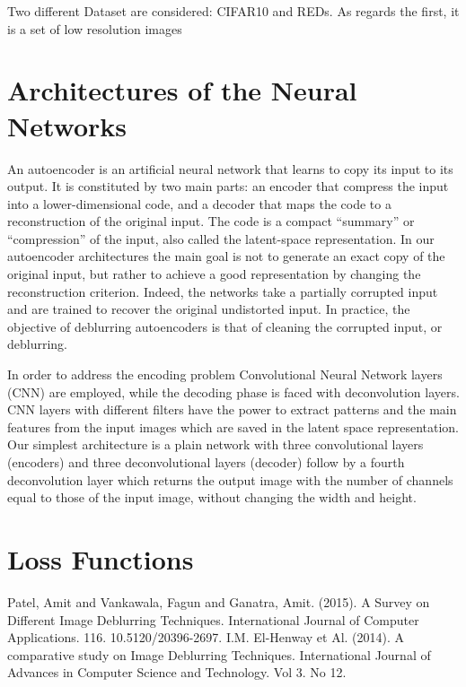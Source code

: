 \documentclass[12pt,a4paper]{article}
\begin{document}
Two different Dataset are considered: CIFAR10 and REDs. As regards the first, it is a set of low resolution images  

\section{Architectures of the Neural Networks}
An autoencoder is an artificial neural network that learns to copy its input to its output. It is constituted by two main parts: an encoder that compress the input into a lower-dimensional code, and a decoder that maps the code to a reconstruction of the original input. The code is a compact “summary” or “compression” of the input, also called the latent-space representation. In our autoencoder architectures the main goal is not to generate an exact copy of the original input, but rather to achieve a good representation by changing the reconstruction criterion. Indeed, the networks take a partially corrupted input and are trained to recover the original undistorted input. In practice, the objective of deblurring autoencoders is that of cleaning the corrupted input, or deblurring. 

In order to address the encoding problem Convolutional Neural Network layers (CNN) are employed, while the decoding phase is faced with deconvolution layers. CNN layers with different filters have the power to extract patterns and the main features from the input images which are saved in the latent space representation. Our simplest architecture is a plain network with three convolutional layers (encoders) and three deconvolutional layers (decoder) follow by a fourth deconvolution layer which returns the output image with the number of channels equal to those of the input image, without changing the width and height.

\section{Loss Functions}


\newpage
\begin{thebibliography}{99}
  Patel, Amit and Vankawala, Fagun and Ganatra, Amit. (2015). A Survey on Different Image Deblurring Techniques. International Journal of Computer Applications. 116. 10.5120/20396-2697. 
 I.M. El-Henway et Al. (2014). A comparative study on Image Deblurring Techniques. International Journal of Advances in Computer Science and Technology. Vol 3. No 12.

\end{thebibliography}
\end{document}
